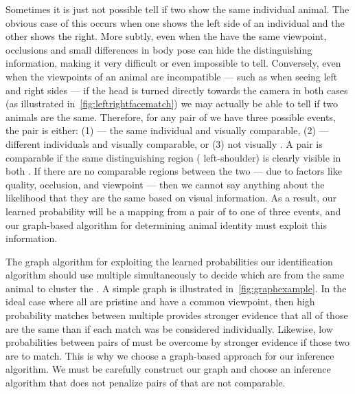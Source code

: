     \leftrightfacematch{}

    Sometimes it is just not possible tell if two \annots{} show the same
      individual animal.
    The obvious case of this occurs when one \annot{} shows the left side of
      an individual and the other shows the right.
    More subtly, even when the \annots{} have the same viewpoint, occlusions
      and small differences in body pose can hide the distinguishing
      information, making it very difficult or even impossible to tell.
    Conversely, even when the viewpoints of an animal are incompatible ---
      such as when seeing left and right sides --- if the head is turned
      directly towards the camera in both cases (as illustrated
      in~\cref{fig:leftrightfacematch}) we may actually be able to tell if two
      animals are the same.
    Therefore, for any pair of \annots{} we have three possible events, the
      pair is either:
    (1)  --- the same individual and visually comparable,
    (2)  --- different individuals and visually
      comparable, or
    (3) not visually .
    A pair is comparable if the same distinguishing region (\eg{}
      left-shoulder) is clearly visible in both \annots{}.
    If there are no comparable regions between the two \annots{} --- due to
      factors like quality, occlusion, and viewpoint --- then we cannot say
      anything about the likelihood that they are the same based on visual
      information.
    As a result, our learned probability will be a mapping from a pair of
      \annots{} to one of three events, and our graph-based algorithm for
      determining animal identity must exploit this information.

    \graphexample{}

    The graph algorithm for exploiting the learned probabilities our
      identification algorithm should use multiple \annots{} simultaneously to
      decide which are from the same animal to cluster the \annots{}.
    A simple graph is illustrated in~\cref{fig:graphexample}.
    In the ideal case where all \annots{} are pristine and have a common
      viewpoint, then high probability matches between multiple \annots{}
      provides stronger evidence that all of those \annots{} are the same
      \name{} than if each match was be considered individually.
    Likewise, low probabilities between pairs of \annots{} must be overcome by
      stronger evidence if those two \annot{} are to match.
    This is why we choose a graph-based approach for our inference algorithm.
    We must be carefully construct our graph and choose an inference algorithm
      that does not penalize pairs of \annots{} that are not comparable.

